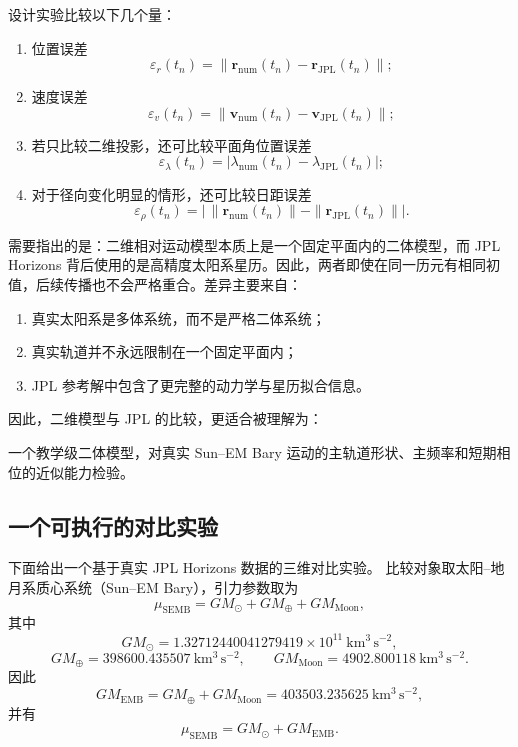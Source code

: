 设计实验比较以下几个量：

\begin{enumerate}[label=\arabic*.]
  \item 位置误差
  \[
  \varepsilon_r(t_n)=\|\bm r_{\mathrm{num}}(t_n)-\bm r_{\mathrm{JPL}}(t_n)\|;
  \]
  \item 速度误差
  \[
  \varepsilon_v(t_n)=\|\bm v_{\mathrm{num}}(t_n)-\bm v_{\mathrm{JPL}}(t_n)\|;
  \]
  \item 若只比较二维投影，还可比较平面角位置误差
  \[
  \varepsilon_\lambda(t_n)=|\lambda_{\mathrm{num}}(t_n)-\lambda_{\mathrm{JPL}}(t_n)|;
  \]
  \item 对于径向变化明显的情形，还可比较日距误差
  \[
  \varepsilon_\rho(t_n)=\left|\,\|\bm r_{\mathrm{num}}(t_n)\|-\|\bm r_{\mathrm{JPL}}(t_n)\|\right|.
  \]
\end{enumerate}

需要指出的是：二维相对运动模型本质上是一个固定平面内的二体模型，而 JPL Horizons 背后使用的是高精度太阳系星历。因此，两者即使在同一历元有相同初值，后续传播也不会严格重合。差异主要来自：
\begin{enumerate}[label=\arabic*.]
  \item 真实太阳系是多体系统，而不是严格二体系统；
  \item 真实轨道并不永远限制在一个固定平面内；
  \item JPL 参考解中包含了更完整的动力学与星历拟合信息。
\end{enumerate}

因此，二维模型与 JPL 的比较，更适合被理解为：
\begin{center}
一个教学级二体模型，对真实 Sun--EM Bary 运动的主轨道形状、主频率和短期相位的近似能力检验。
\end{center}

\subsection{一个可执行的对比实验}

下面给出一个基于真实 JPL Horizons 数据的三维对比实验。
比较对象取太阳--地月系质心系统（Sun--EM Bary），引力参数取为
\[
\mu_{\mathrm{SEMB}} = GM_\odot + GM_\oplus + GM_{\mathrm{Moon}},
\]
其中
\[
GM_\odot = 1.32712440041279419\times 10^{11}\ \mathrm{km^3\,s^{-2}},
\]
\[
GM_\oplus = 398600.435507\ \mathrm{km^3\,s^{-2}},
\qquad
GM_{\mathrm{Moon}} = 4902.800118\ \mathrm{km^3\,s^{-2}}.
\]
因此
\[
GM_{\mathrm{EMB}} = GM_\oplus + GM_{\mathrm{Moon}} = 403503.235625\ \mathrm{km^3\,s^{-2}},
\]
并有
\[
\mu_{\mathrm{SEMB}} = GM_\odot + GM_{\mathrm{EMB}}.
\]

